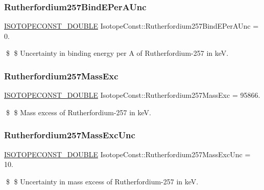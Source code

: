 \subsubsection{\texorpdfstring{Rutherfordium257\+Bind\+E\+Per\+A\+Unc}{Rutherfordium257BindEPerAUnc}}
{\footnotesize\ttfamily \mbox{\hyperlink{group___isotope_const-_macros_ga8f45a7272ce02c0b4c65c44636ed719a}{I\+S\+O\+T\+O\+P\+E\+C\+O\+N\+S\+T\+\_\+\+D\+O\+U\+B\+LE}} Isotope\+Const\+::\+Rutherfordium257\+Bind\+E\+Per\+A\+Unc = 0.}

\$ \$ Uncertainty in binding energy per A of Rutherfordium-\/257 in keV. \mbox{\label{group___isotope_const-_rutherfordium-_rf257_ga5f32a1c8179d985c2632f1894236a7a7}} 
\subsubsection{\texorpdfstring{Rutherfordium257\+Mass\+Exc}{Rutherfordium257MassExc}}
{\footnotesize\ttfamily \mbox{\hyperlink{group___isotope_const-_macros_ga8f45a7272ce02c0b4c65c44636ed719a}{I\+S\+O\+T\+O\+P\+E\+C\+O\+N\+S\+T\+\_\+\+D\+O\+U\+B\+LE}} Isotope\+Const\+::\+Rutherfordium257\+Mass\+Exc = 95866.}

\$ \$ Mass excess of Rutherfordium-\/257 in keV. \mbox{\label{group___isotope_const-_rutherfordium-_rf257_ga28205e98e716a283130ce7b7c55b65a8}} 
\subsubsection{\texorpdfstring{Rutherfordium257\+Mass\+Exc\+Unc}{Rutherfordium257MassExcUnc}}
{\footnotesize\ttfamily \mbox{\hyperlink{group___isotope_const-_macros_ga8f45a7272ce02c0b4c65c44636ed719a}{I\+S\+O\+T\+O\+P\+E\+C\+O\+N\+S\+T\+\_\+\+D\+O\+U\+B\+LE}} Isotope\+Const\+::\+Rutherfordium257\+Mass\+Exc\+Unc = 10.}

\$ \$ Uncertainty in mass excess of Rutherfordium-\/257 in keV. \mbox{\label{group___isotope_const-_rutherfordium-_rf257_ga735e18cbd1e17f624acaa9d4fb945194}} 

